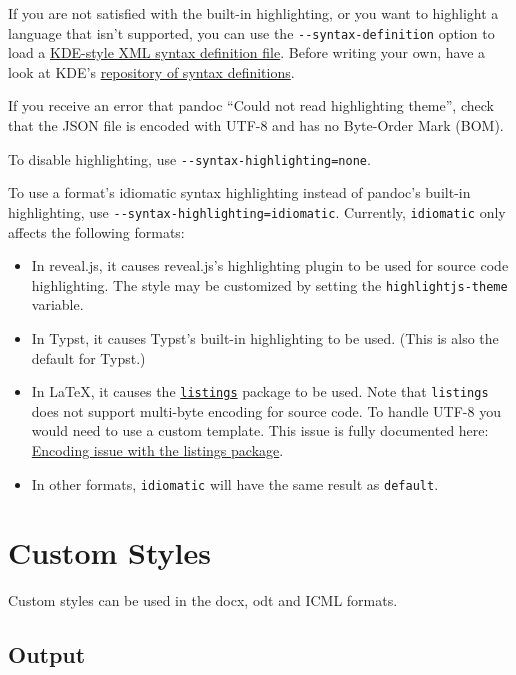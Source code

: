 \documentclass[
]{article}
\begin{document}
If you are not satisfied with the built-in highlighting, or you want to
highlight a language that isn't supported, you can use the
\texttt{-\/-syntax-definition} option to load a
\href{https://docs.kde.org/stable5/en/kate/katepart/highlight.html}{KDE-style
XML syntax definition file}. Before writing your own, have a look at
KDE's
\href{https://github.com/KDE/syntax-highlighting/tree/master/data/syntax}{repository
of syntax definitions}.

If you receive an error that pandoc ``Could not read highlighting
theme'', check that the JSON file is encoded with UTF-8 and has no
Byte-Order Mark (BOM).

To disable highlighting, use \texttt{-\/-syntax-highlighting=none}.

To use a format's idiomatic syntax highlighting instead of pandoc's
built-in highlighting, use \texttt{-\/-syntax-highlighting=idiomatic}.
Currently, \texttt{idiomatic} only affects the following formats:

\begin{itemize}
\item
  In reveal.js, it causes reveal.js's highlighting plugin to be used for
  source code highlighting. The style may be customized by setting the
  \texttt{highlightjs-theme} variable.
\item
  In Typst, it causes Typst's built-in highlighting to be used. (This is
  also the default for Typst.)
\item
  In LaTeX, it causes the
  \href{https://ctan.org/pkg/listings}{\texttt{listings}} package to be
  used. Note that \texttt{listings} does not support multi-byte encoding
  for source code. To handle UTF-8 you would need to use a custom
  template. This issue is fully documented here:
  \href{https://en.wikibooks.org/wiki/LaTeX/Source_Code_Listings\#Encoding_issue}{Encoding
  issue with the listings package}.
\item
  In other formats, \texttt{idiomatic} will have the same result as
  \texttt{default}.
\end{itemize}

\hypertarget{custom-styles}{%
\section{Custom Styles}\label{custom-styles}}

Custom styles can be used in the docx, odt and ICML formats.

\hypertarget{output}{%
\subsection{Output}\label{output}}
\end{document}
